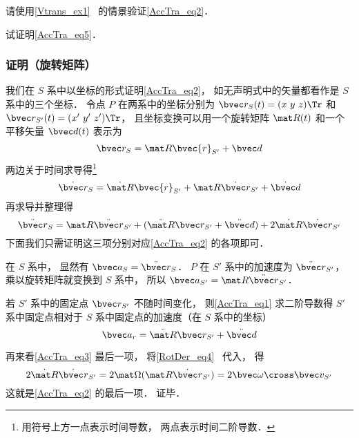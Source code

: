 \begin{exercise}{}
请使用\autoref{Vtrans_ex1}~ 的情景验证\autoref{AccTra_eq2}．
\end{exercise}

\begin{exercise}{}
试证明\autoref{AccTra_eq5}．
\end{exercise}

\subsubsection{证明（旋转矩阵）}
我们在 $S$ 系中以坐标的形式证明\autoref{AccTra_eq2}， 如无声明式中的矢量都看作是 $S$ 系中的三个坐标． 令点 $P$ 在两系中的坐标分别为 $\bvec r_S(t) = (x\ y\ z)\Tr$ 和 $\bvec r_{S'}(t) = (x'\ y'\ z')\Tr$， 且坐标变换可以用一个旋转矩阵 $\mat R(t)$ 和一个平移矢量 $\bvec d(t)$ 表示为
\begin{equation}
\bvec r_S = \mat R \bvec{r}_{S'} + \bvec d
\end{equation}
两边关于时间求导得\footnote{用符号上方一点表示时间导数， 两点表示时间二阶导数．}
\begin{equation}
\dot{\bvec r}_S = \dot{\mat R} \bvec{r}_{S'} + \mat R \dot{\bvec r}_{S'}+ \dot{\bvec d}
\end{equation}
再求导并整理得
\begin{equation}\label{AccTra_eq3}
\ddot{\bvec r}_S = \mat R \ddot{\bvec r}_{S'} + (\ddot{\mat R} \bvec r_{S'} + \ddot{\bvec d}) + 2 \dot{\mat R} \dot{\bvec r}_{S'}
\end{equation}
下面我们只需证明这三项分别对应\autoref{AccTra_eq2} 的各项即可．

在 $S$ 系中， 显然有 $\bvec a_S = \ddot{\bvec r}_S$． $P$ 在 $S'$ 系中的加速度为 $\ddot{\bvec r}_{S'}$， 乘以旋转矩阵就变换到 $S$ 系中， 所以 $\bvec a_{S'} = \mat R \ddot{\bvec r}_{S'}$．

若 $S'$ 系中的固定点 $\bvec r_{S'}$ 不随时间变化， 则\autoref{AccTra_eq1} 求二阶导数得 $S'$ 系中固定点相对于 $S$ 系中固定点的加速度（在 $S$ 系中的坐标）
\begin{equation}
\bvec a_r = \ddot{\mat R} \bvec r_{S'} + \ddot{\bvec d}
\end{equation}

再来看\autoref{AccTra_eq3} 最后一项， 将\autoref{RotDer_eq4}~ 代入， 得
\begin{equation}
2\dot{\mat R} \dot{\bvec r}_{S'} = 2\mat\Omega (\mat R \dot{\bvec r}_{S'}) = 2\bvec \omega \cross \bvec v_{S'}
\end{equation}
这就是\autoref{AccTra_eq2} 的最后一项． 证毕．
